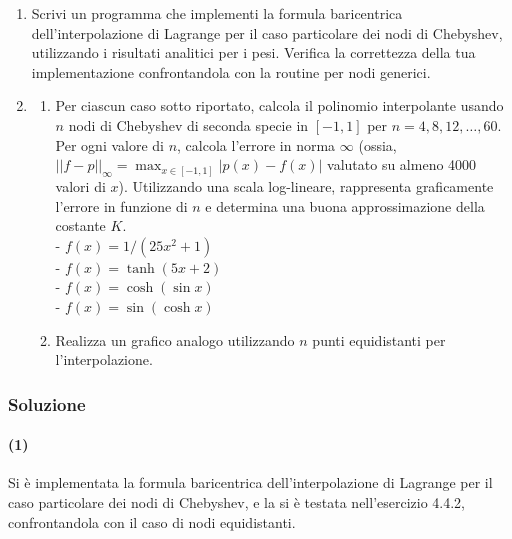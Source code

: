 \documentclass[letterpaper, 12pt]{article}
\numberwithin{equation}{section}    %
\begin{document}
\begin{enumerate}
    \item Scrivi un programma che implementi la formula baricentrica dell'interpolazione di Lagrange 
    per il caso particolare dei nodi di Chebyshev, utilizzando i risultati analitici per i pesi. 
    Verifica la correttezza della tua implementazione confrontandola con la routine per nodi generici.

    \item 
    \begin{enumerate}
        \item Per ciascun caso sotto riportato, calcola il polinomio interpolante usando $n$ nodi di Chebyshev di 
        seconda specie in $[-1,1]$ per $n=4,8,12,\ldots,60$. Per ogni valore di $n$, calcola l'errore in norma $\infty$ 
        (ossia, $||f-p||_\infty=\max_{x\in[-1,1]} |p(x)-f(x)|$ valutato su almeno 4000 valori di $x$). 
        Utilizzando una scala log-lineare, rappresenta graficamente l'errore in funzione di $n$ e determina una 
        buona approssimazione della costante $K$. \\
        - $f(x) = 1/(25x^2+1)$  \\ 
        - $f(x) = \tanh(5 x+2)$ \\ 
        - $f(x) = \cosh(\sin x)$ \\ 
        - $f(x) = \sin(\cosh x)$  \\

        \item Realizza un grafico analogo utilizzando $n$ punti equidistanti per l'interpolazione.
    \end{enumerate}
\end{enumerate}

\subsubsection{Soluzione}
\paragraph{(1)}Si è implementata la formula baricentrica dell'interpolazione di Lagrange per il caso
particolare dei nodi di Chebyshev, e la si è testata nell'esercizio 4.4.2, confrontandola con il caso di 
nodi equidistanti. 
\end{document}
